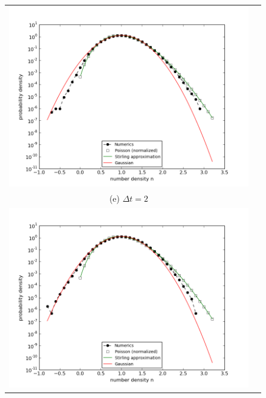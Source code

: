\documentclass{article}
\begin{document}
\begin{figure}
\begin{tabular}{cc}
\includegraphics[width=0.5\linewidth]{fig1/2d_REACT_dt1_hist.png} \\ 
(e) $\Delta t=2$ & \\
\includegraphics[width=0.5\linewidth]{fig1/2d_REACT_dt2_hist.png} &
\end{tabular}
\caption{\label{fig_2d_REACT_hist}}
\end{figure}
\end{document}
